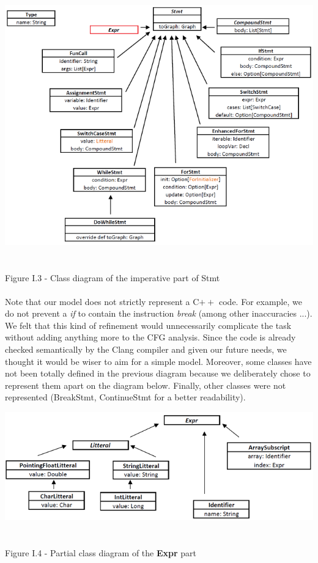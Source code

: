 \documentclass{report}
\begin{document}
\begin{center}
\includegraphics[scale=0.9]{data/stmt.png}
~\\~\\Figure I.3 - Class diagram of the imperative part of Stmt
\end{center}

\paragraph{}
\hspace{4mm}\textnormal{Note that our model does not strictly represent a C$++$ code. For example, we do not prevent a \textit{if} to contain the instruction \textit{break}
(among other inaccuracies ...). We felt that this kind of refinement would unnecessarily complicate the task without adding anything more to the CFG analysis. 
Since the code is already checked semantically by the Clang compiler and given our future needs, we thought it would be wiser to aim for a simple model.
Moreover, some classes have not been totally defined in the previous diagram because we deliberately chose to represent them apart on 
the diagram below. Finally, other classes were not represented (BreakStmt, ContinueStmt for a better readability).}

\begin{center}
\includegraphics[scale=0.8]{data/expr1.png}
~\\~\\Figure I.4 - Partial class diagram of the \textbf{Expr} part
\end{center}
\end{document}
